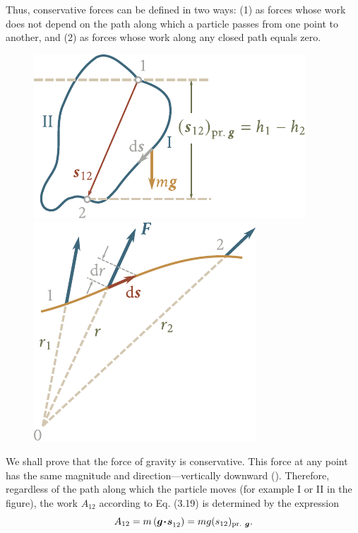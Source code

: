 Thus, conservative forces can be defined in two ways: (1) as forces whose work does not depend on the path along which a particle passes from one point to another, and (2) as forces whose work along any closed path equals zero.

\begin{figure}[t]
	\begin{minipage}[t]{0.5\linewidth}
		\begin{center}
			\includegraphics[scale=0.92]{figures/ch_03/fig_3_6.pdf}
			\caption[]{}
			\label{fig:3_6}
		\end{center}
	\end{minipage}
	\hspace{-0.05cm}
	\begin{minipage}[t]{0.5\linewidth}
		\begin{center}
			\includegraphics[scale=0.9]{figures/ch_03/fig_3_7.pdf}
			\caption[]{}
			\label{fig:3_7}
		\end{center}
	\end{minipage}
	\vspace{-0.3cm}
\end{figure}

We shall prove that the force of gravity is conservative. This force at any point has the same magnitude and direction---vertically downward (). Therefore, regardless of the path along which the particle moves (for example I or II in the figure), the work $A_{12}$ according to Eq. (3.19) is determined by the expression
\begin{equation*}
A_{12} = m\,(\boldsymbol{g\!\cdot\!s}_{12}) = mg(s_{12})_{\text{pr. }\boldsymbol{g}}.
\end{equation*}

